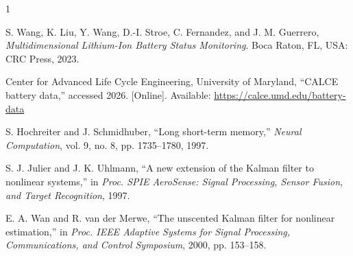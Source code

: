 \documentclass[lettersize,journal]{IEEEtran}
\begin{document}
\balance

\begin{thebibliography}{1}

S. Wang, K. Liu, Y. Wang, D.-I. Stroe, C. Fernandez, and J. M. Guerrero, \emph{Multidimensional Lithium-Ion Battery Status Monitoring}. Boca Raton, FL, USA: CRC Press, 2023.

Center for Advanced Life Cycle Engineering, University of Maryland, ``CALCE battery data,'' accessed 2026. [Online]. Available: \url{https://calce.umd.edu/battery-data}

S. Hochreiter and J. Schmidhuber, ``Long short-term memory,'' \emph{Neural Computation}, vol. 9, no. 8, pp. 1735--1780, 1997.

S. J. Julier and J. K. Uhlmann, ``A new extension of the Kalman filter to nonlinear systems,'' in \emph{Proc. SPIE AeroSense: Signal Processing, Sensor Fusion, and Target Recognition}, 1997.

E. A. Wan and R. van der Merwe, ``The unscented Kalman filter for nonlinear estimation,'' in \emph{Proc. IEEE Adaptive Systems for Signal Processing, Communications, and Control Symposium}, 2000, pp. 153--158.

\end{thebibliography}
\end{document}
